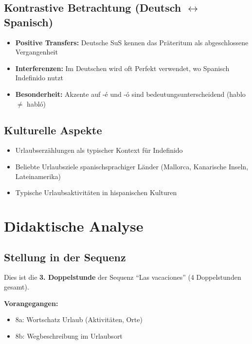 \documentclass[11pt,a4paper]{article}
\newcommand{\reihenthema}{Las vacaciones}
\begin{document}
\subsection{Kontrastive Betrachtung (Deutsch $\leftrightarrow$ Spanisch)}
\begin{itemize}
    \item \textbf{Positive Transfers:} Deutsche SuS kennen das Präteritum als abgeschlossene Vergangenheit
    \item \textbf{Interferenzen:} Im Deutschen wird oft Perfekt verwendet, wo Spanisch Indefinido nutzt
    \item \textbf{Besonderheit:} Akzente auf -é und -ó sind bedeutungsunterscheidend (hablo $\neq$ habló)
\end{itemize}

\subsection{Kulturelle Aspekte}
\begin{itemize}
    \item Urlaubserzählungen als typischer Kontext für Indefinido
    \item Beliebte Urlaubsziele spanischsprachiger Länder (Mallorca, Kanarische Inseln, Lateinamerika)
    \item Typische Urlaubsaktivitäten in hispanischen Kulturen
\end{itemize}

\section{Didaktische Analyse}

\subsection{Stellung in der Sequenz}
Dies ist die \textbf{3. Doppelstunde} der Sequenz ``\reihenthema'' (4 Doppelstunden gesamt).

\textbf{Vorangegangen:}
\begin{itemize}
    \item 8a: Wortschatz Urlaub (Aktivitäten, Orte)
    \item 8b: Wegbeschreibung im Urlaubsort
\end{itemize}
\end{document}
